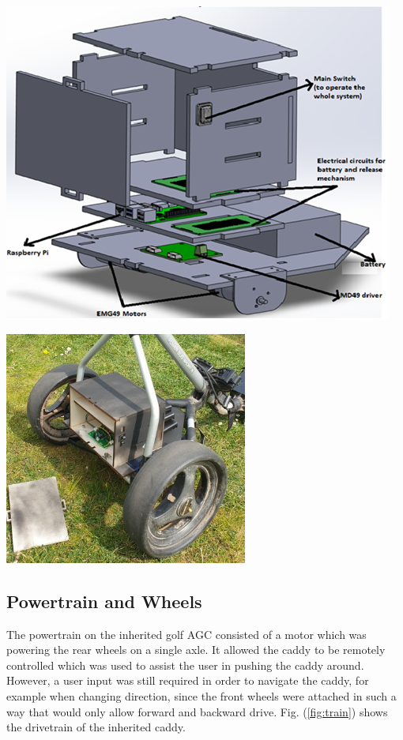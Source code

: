 \documentclass[11pt,landscape]{article}
\newenvironment{Figure}
  {\par\medskip\noindent\minipage{\linewidth}}
  {\endminipage\par\medskip}
\begin{document}
\begin{multicols}{2}
\begin{Figure}
    \begin{center}
        \includegraphics[width=\textwidth]{basefinal.png}
        \label{fig:final}
    \end{center}
\end{Figure}

\begin{Figure}
    \begin{center}
        \includegraphics[width=0.6\textwidth]{Figure37.jpg}
        \label{fig:blackcaddy}
    \end{center}
\end{Figure}
    
\subsection{Powertrain and Wheels}
The powertrain on the inherited golf AGC consisted of a motor which was
powering the rear wheels on a single axle. It allowed the caddy to be
remotely controlled which was used to assist the user in pushing the caddy
around. However, a user input was still required in order to navigate the
caddy, for example when changing direction, since the front wheels were
attached in such a way that would only allow forward and backward drive.
Fig. (\ref{fig:train}) shows the drivetrain of the inherited caddy.


\end{multicols}
\end{document}
